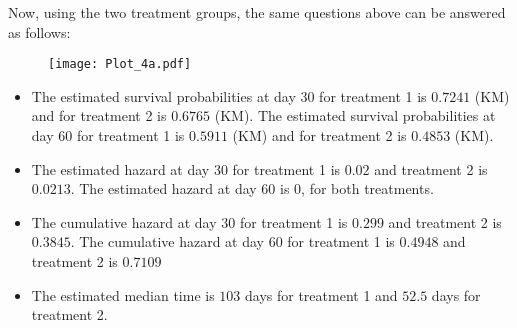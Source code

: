\documentclass[11pt]{extarticle} %
\begin{document}
Now, using the two treatment groups, the same questions above can be answered as follows:
\begin{figure}[H]
\begin{center}
\texttt{[image: Plot\_4a.pdf]}
\end{center}
\end{figure}

\begin{itemize}
\item 
The estimated survival probabilities at day 30 for treatment 1 is $0.7241$ (KM) and for treatment 2 is $0.6765$ (KM). The estimated survival probabilities at day 60 for treatment 1 is $0.5911$ (KM) and for treatment 2 is $0.4853$ (KM).
\item
The estimated hazard at day 30 for treatment 1 is $0.02$ and treatment 2 is $0.0213$. The estimated hazard at day 60 is $0$, for both treatments.
\item
The cumulative hazard at day 30 for treatment 1 is $0.299$ and treatment 2 is $0.3845$. The cumulative hazard at day 60 for treatment 1 is $0.4948$ and treatment 2 is $0.7109$
\item
The estimated median time is $103$ days for treatment 1 and $52.5$ days for treatment 2.
\end{itemize}


\end{document}
